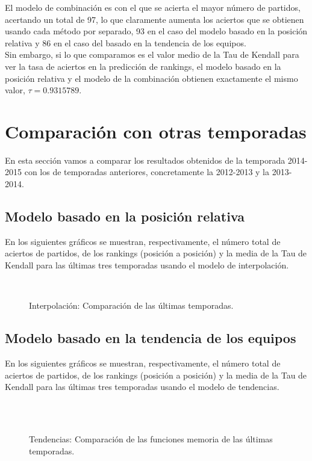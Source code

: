 El modelo de combinación es con el que se acierta el mayor número de partidos, acertando un total de 97, lo que claramente aumenta los aciertos que se obtienen usando cada método por separado, 93 en el caso del modelo basado en la posición relativa y 86 en el caso del basado en la tendencia de los equipos. \\

Sin embargo, si lo que comparamos es el valor medio de la Tau de Kendall para ver la tasa de aciertos en la predicción de rankings, el modelo basado en la posición relativa y el modelo de la combinación obtienen exactamente el mismo valor, $\tau=0.9315789$.\\ 

\section{Comparación con otras temporadas}
En esta sección vamos a comparar los resultados obtenidos de la temporada 2014-2015 con los de temporadas anteriores, concretamente la 2012-2013 y la 2013-2014.

\subsection{Modelo basado en la posición relativa}
En los siguientes gráficos se muestran, respectivamente, el número total de aciertos de partidos, de los rankings (posición a posición) y la media de la Tau de Kendall para las últimas tres temporadas usando el modelo de interpolación.

\begin{figure}[H]
	\centering
	\\
	\caption{Interpolación: Comparación de las últimas temporadas.}
\end{figure}

\subsection{Modelo basado en la tendencia de los equipos}
En los siguientes gráficos se muestran, respectivamente, el número total de aciertos de partidos, de los rankings (posición a posición) y la media de la Tau de Kendall para las últimas tres temporadas usando el modelo de tendencias.
\begin{figure}[H]
	\centering
	\\
	\\	
	\caption{Tendencias: Comparación de las funciones memoria de las últimas temporadas.}
\end{figure}

